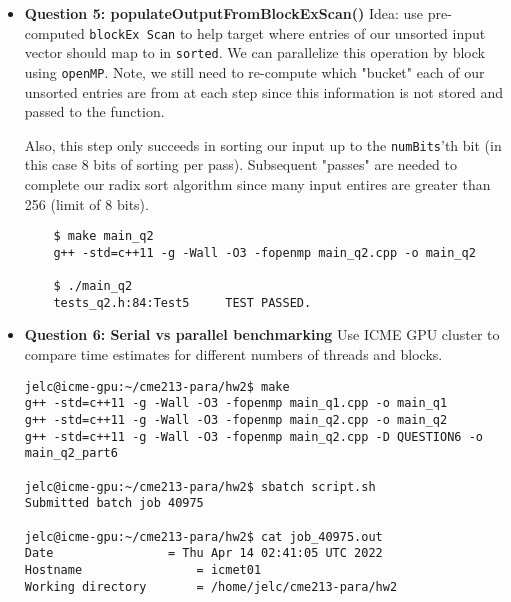 \documentclass[12pt,letterpaper,twoside]{article}
\begin{document}
\begin{itemize}
    \item \textbf{Question 5: populateOutputFromBlockExScan()} Idea: use pre-computed
    \texttt{blockEx Scan} to help target where entries of our unsorted input vector
    should map to in \texttt{sorted}. We can parallelize this operation by block using 
    \texttt{openMP}. Note, we still need to re-compute which "bucket" each of our unsorted 
    entries are from at each step since this information is not stored and passed to the 
    function. 
    
    Also, this step only succeeds in sorting our input up to the \texttt{numBits}'th 
    bit (in this case 8 bits of sorting per pass). Subsequent "passes" are needed to complete
    our radix sort algorithm since many input entires are greater than 256 (limit of 8 bits).

    \begin{verbatim}
    $ make main_q2
    g++ -std=c++11 -g -Wall -O3 -fopenmp main_q2.cpp -o main_q2

    $ ./main_q2
    tests_q2.h:84:Test5     TEST PASSED.
    \end{verbatim}

    \item \textbf{Question 6: Serial vs parallel benchmarking} Use ICME GPU cluster to 
    compare time estimates for different numbers of threads and blocks. 

\begin{verbatim}
jelc@icme-gpu:~/cme213-para/hw2$ make
g++ -std=c++11 -g -Wall -O3 -fopenmp main_q1.cpp -o main_q1
g++ -std=c++11 -g -Wall -O3 -fopenmp main_q2.cpp -o main_q2
g++ -std=c++11 -g -Wall -O3 -fopenmp main_q2.cpp -D QUESTION6 -o main_q2_part6

jelc@icme-gpu:~/cme213-para/hw2$ sbatch script.sh 
Submitted batch job 40975

jelc@icme-gpu:~/cme213-para/hw2$ cat job_40975.out 
Date				= Thu Apr 14 02:41:05 UTC 2022
Hostname				= icmet01
Working directory 		= /home/jelc/cme213-para/hw2


\end{verbatim}
\end{itemize}
\end{document}
